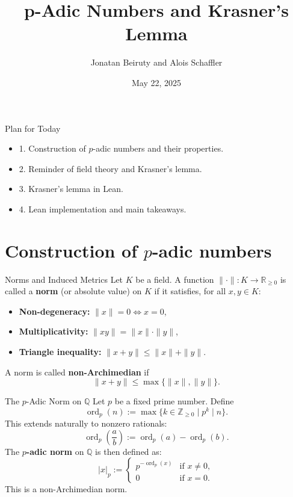 \documentclass{beamer}
\title{p-Adic Numbers and Krasner's Lemma}
\author{Jonatan Beiruty and Alois Schaffler}
\date{May 22, 2025}
\begin{document}
\maketitle
\begin{frame}{Plan for Today}

\begin{itemize}
    \item 1. Construction of \(p\)-adic numbers and their properties.
    \item 2. Reminder of field theory and Krasner's lemma.
    \item 3. Krasner's lemma in Lean.
    \item 4. Lean implementation and main takeaways.
\end{itemize}

\end{frame}



\section{Construction of \(p\)-adic numbers}
\begin{frame}{Norms and Induced Metrics} 
Let $K$ be a field. A function $\|\cdot\| : K \to \mathbb{R}_{\geq 0}$ is called a \textbf{norm} (or absolute value) on $K$ if it satisfies, for all $x, y \in K$:
\begin{itemize}
    \item \textbf{Non-degeneracy:} $\|x\| = 0 \iff x = 0$,
    \item \textbf{Multiplicativity:} $\|xy\| = \|x\| \cdot \|y\|$,
    \item \textbf{Triangle inequality:} $\|x + y\| \leq \|x\| + \|y\|$.
\end{itemize}
\pause 
A norm is called \textbf{non-Archimedian} if 
\begin{equation*}
    \|x + y\| \leq \max\{\|x\|, \|y\|\}.
\end{equation*}
\end{frame}

\begin{frame}{The $p$-Adic Norm on $\mathbb{Q}$}
Let $p$ be a fixed prime number. Define
\[
\operatorname{ord}_p(n) := \max\{k \in \mathbb{Z}_{\geq 0} \mid p^k \mid n \}.
\]
\pause
This extends naturally to nonzero rationals:
\[
\operatorname{ord}_p\left(\frac{a}{b}\right) := \operatorname{ord}_p(a) - \operatorname{ord}_p(b).
\]
\pause
The \textbf{$p$-adic norm} on $\mathbb{Q}$ is then defined as:
\[
|x|_p := 
\begin{cases}
p^{-\operatorname{ord}_p(x)} & \text{if } x \neq 0, \\
0 & \text{if } x = 0.
\end{cases}
\]
This is a non-Archimedian norm.
\end{frame}
\end{document}
